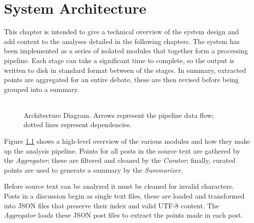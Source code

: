 \chapter{System Architecture\label{chap:system-architecture}}
  This chapter is intended to give a technical overview of the system design and add context to the analyses detailed in the following chapters. The system has been implemented as a series of isolated modules that together form a processing pipeline. Each stage can take a significant time to complete, so the output is written to disk in standard format between of the stages. In summary, extracted points are aggregated for an entire debate, these are then revised before being grouped into a summary.

  \begin{figure}[!h]
    \centering
    \caption{\\Architecture Diagram. Arrows represent the pipeline data flow; dotted lines represent dependencies.}
    \label{fig:arch-dia}
  \end{figure}

  Figure \ref{fig:arch-dia} shows a high-level overview of the various modules and how they make up the analysis pipeline. Points for all posts in the source text are gathered by the \textit{Aggregator}; these are filtered and cleaned by the \textit{Curator}; finally, curated points are used to generate a summary by the \textit{Summarizer}.

  Before source text can be analyzed it must be cleaned for invalid characters. Posts in a discussion begin as single text files, these are loaded and transformed into JSON files that preserve their index and valid UTF-8 content. The \textit{Aggregator} loads these JSON post files to extract the points made in each post.

